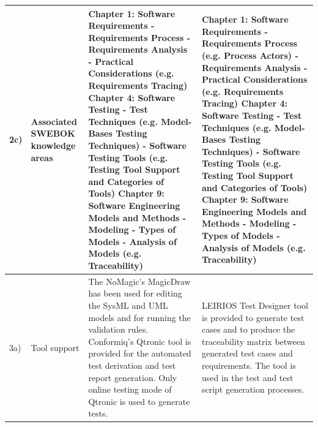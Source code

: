 \begin{landscape}
\begin{small}
\begin{longtable}{ p{0.5cm} | p{2.5cm} | p{9cm} | p{9cm} }
\hline
2c) & Associated SWEBOK\footnotemark{ \footnotetext {SWEBOK \url{https://www.computer.org/education/bodies-of-knowledge/software-engineering}}} knowledge areas & Chapter 1: Software Requirements
\newline - Requirements Process
\newline - Requirements Analysis
\newline - Practical Considerations (e.g. Requirements Tracing)
\newline Chapter 4: Software Testing
\newline - Test Techniques (e.g. Model-Bases Testing Techniques)
\newline -  Software Testing Tools (e.g. Testing Tool Support and Categories of Tools)
\newline Chapter 9: Software Engineering Models and Methods 
\newline - Modeling
\newline - Types of Models
\newline - Analysis of Models (e.g. Traceability) & Chapter 1: Software Requirements 
\newline - Requirements Process (e.g. Process Actors)
\newline - Requirements Analysis
\newline - Practical Considerations (e.g. Requirements Tracing)
\newline Chapter 4: Software Testing
\newline - Test Techniques (e.g. Model-Bases Testing Techniques)
\newline -  Software Testing Tools (e.g. Testing Tool Support and Categories of Tools)
\newline Chapter 9: Software Engineering Models and Methods 
\newline - Modeling
\newline - Types of Models
\newline - Analysis of Models (e.g. Traceability) \\  
\hline
3a) &Tool support & The NoMagic’s MagicDraw has been used for editing the SysML and UML models and for running the validation rules. \newline Conformiq’s Qtronic tool is provided for the automated test derivation and test report generation. Only online testing mode of Qtronic is used to generate tests. & LEIRIOS Test Designer tool is provided to generate test cases and to produce the traceability matrix between generated test cases and requirements. The tool is used in the test and test script generation processes.\\

\end{longtable}
\end{small}
\end{landscape}
